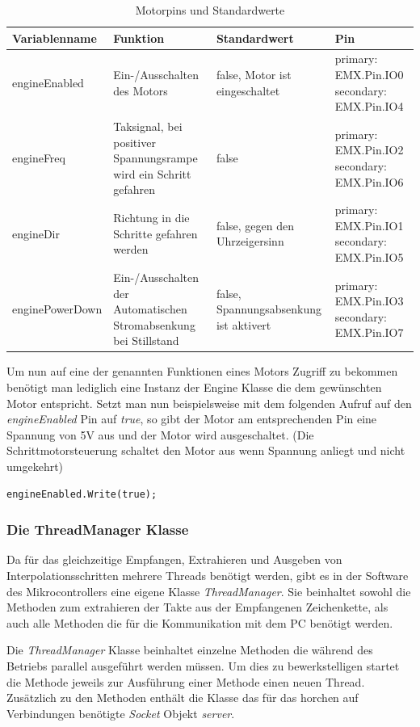 \begin{table}[h]
\begin{tabular}{|p{3cm}|p{3.5cm}|p{3.5cm}|p{3.5cm}|}
\hline \rowcolor{lightgray}
\textbf{Variablenname} & \textbf{Funktion} & \textbf{Standardwert} &\textbf{Pin}\\
\hline
engineEnabled & Ein-/Ausschalten des Motors & false, Motor ist eingeschaltet & primary: EMX.Pin.IO0 secondary: EMX.Pin.IO4\\
\hline
engineFreq & Taksignal, bei positiver Spannungsrampe wird ein Schritt gefahren & false & primary: EMX.Pin.IO2 secondary: EMX.Pin.IO6\\
\hline
engineDir & Richtung in die Schritte gefahren werden & false, gegen den Uhrzeigersinn & primary: EMX.Pin.IO1 secondary: EMX.Pin.IO5\\
\hline
enginePowerDown & Ein-/Ausschalten der Automatischen Stromabsenkung bei Stillstand & false, Spannungsabsenkung ist aktivert & primary: EMX.Pin.IO3 secondary: EMX.Pin.IO7\\
\hline
\end{tabular}
\caption{Motorpins und Standardwerte}
\end{table}
Um nun auf eine der genannten Funktionen eines Motors Zugriff zu bekommen benötigt man lediglich eine Instanz der Engine Klasse die dem gewünschten Motor entspricht. Setzt man nun beispielsweise mit dem folgenden Aufruf auf den \textit{engineEnabled} Pin auf \textit{true}, so gibt der Motor am entsprechenden Pin eine Spannung von 5V aus und der Motor wird ausgeschaltet. (Die Schrittmotorsteuerung schaltet den Motor aus wenn Spannung anliegt und nicht umgekehrt)
\begin{lstlisting}[language = CSharp, captionpos=b, caption={Das Setzen eines OutputPins}]
engineEnabled.Write(true);
\end{lstlisting}
 
\subsubsection{Die ThreadManager Klasse}
Da für das gleichzeitige Empfangen, Extrahieren und Ausgeben von Interpolationsschritten mehrere Threads benötigt werden, gibt es in der Software des Mikrocontrollers eine eigene Klasse \textit{ThreadManager}. Sie beinhaltet sowohl die Methoden zum extrahieren der Takte aus der Empfangenen Zeichenkette, als auch alle Methoden die für die Kommunikation mit dem PC benötigt werden.

Die \textit{ThreadManager} Klasse beinhaltet einzelne Methoden die während des Betriebs parallel ausgeführt werden müssen. Um dies zu bewerkstelligen startet die Methode jeweils zur Ausführung einer Methode einen neuen Thread. Zusätzlich zu den Methoden enthält die Klasse das für das horchen auf Verbindungen benötigte \textit{Socket} Objekt \textit{server}.


